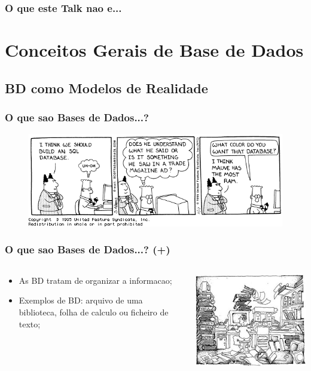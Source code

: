 \documentclass[hyperref={pdfpagelabels=true}]{beamer}
\begin{document}
\begin{frame}
\frametitle{O que este Talk nao e...}
\end{frame}

\section{Conceitos Gerais de Base de Dados}
\subsection{BD como Modelos de Realidade}
\begin{frame}
\frametitle{O que sao Bases de Dados...?}
\begin{overprint}
\begin{figure}
\includegraphics[scale=0.4]{dilbert_db.png}
\end{figure}
\end{overprint}
\end{frame}

\begin{frame}
\frametitle{O que sao Bases de Dados...? (+)}
\begin{columns}
  \begin{column}{7cm}
    \begin{itemize}
      \item<2-> As BD tratam de organizar a informacao;
      \item<3-> Exemplos de BD: arquivo de uma biblioteca, folha de calculo ou ficheiro de texto;
    \end{itemize}
  \end{column}
  \begin{column}{10cm}
    \includegraphics[scale=0.4]{informationoverloadcartoon.jpg}
  \end{column}  
\end{columns}
\end{frame}
\end{document}

